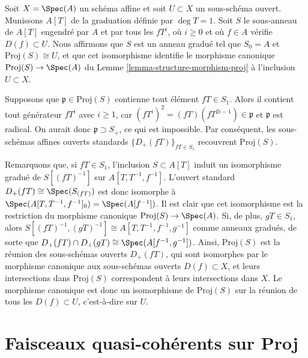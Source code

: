 \begin{example}
\label{example-open-subset-proj}
Soit $X = \Spec(A)$ un schéma affine et soit $U \subset X$ un sous-schéma
ouvert. Munissons $A[T]$ de la graduation définie par $\deg T = 1$.
Soit $S$ le sous-anneau de $A[T]$ engendré par $A$ et par tous les $fT^i$,
où $i \ge 0$ et où $f \in A$ vérifie $D(f) \subset U$. Nous affirmons que
$S$ est un anneau gradué tel que $S_0 = A$ et
$\text{Proj}(S) \cong U$, et que cet isomorphisme identifie le morphisme
canonique $\text{Proj}(S) \to \Spec(A)$ du
Lemme \ref{lemma-structure-morphism-proj} à l'inclusion $U \subset X$.

\medskip\noindent
Supposons que $\mathfrak p \in \text{Proj}(S)$ contienne tout élément
$fT \in S_1$. Alors il contient tout générateur $fT^i$ avec $i \ge 1$, car
$(fT^i)^2 = (fT)(fT^{2i-1}) \in \mathfrak p$ et $\mathfrak p$ est radical.
On aurait donc $\mathfrak p \supset S_+$, ce qui est impossible. Par
conséquent, les sous-schémas affines ouverts standards
$\{D_+(fT)\}_{fT \in S_1}$ recouvrent $\text{Proj}(S)$.

\medskip\noindent
Remarquons que, si $fT \in S_1$, l'inclusion $S \subset A[T]$ induit un
isomorphisme gradué de $S[(fT)^{-1}]$ sur
$A[T, T^{-1}, f^{-1}]$. L'ouvert standard
$D_+(fT) \cong \Spec(S_{(fT)})$ est donc isomorphe à
$\Spec(A[T, T^{-1}, f^{-1}]_0) = \Spec(A[f^{-1}])$.
Il est clair que cet isomorphisme est la restriction du morphisme canonique
$\text{Proj}(S) \to \Spec(A)$. Si, de plus, $gT \in S_1$, alors
$S[(fT)^{-1}, (gT)^{-1}] \cong A[T, T^{-1}, f^{-1}, g^{-1}]$
comme anneaux gradués, de sorte que
$D_+(fT) \cap D_+(gT) \cong \Spec(A[f^{-1}, g^{-1}])$.
Ainsi, $\text{Proj}(S)$ est la réunion des sous-schémas ouverts $D_+(fT)$,
qui sont isomorphes par le morphisme canonique aux sous-schémas ouverts
$D(f) \subset X$, et leurs intersections dans $\text{Proj}(S)$ correspondent
à leurs intersections dans $X$. Le morphisme canonique est donc un
isomorphisme de $\text{Proj}(S)$ sur la réunion de tous les
$D(f) \subset U$, c'est-à-dire sur $U$.
\end{example}


\section{Faisceaux quasi-cohérents sur Proj}
\label{section-quasi-coherent-proj}

